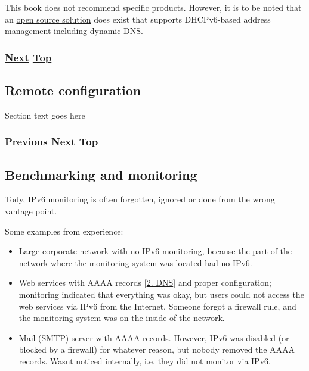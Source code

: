 \documentclass[
]{article}
\begin{document}
This book does not recommend specific products. However, it is to be
noted that an \href{https://www.isc.org/kea/}{open source solution} does
exist that supports DHCPv6-based address management including dynamic
DNS.

\subsubsection{\texorpdfstring{\hyperref[remote-configuration]{Next}
\hyperref[management-and-operations]{Top}}{Next Top}}\label{next-top-5}

\pagebreak

\subsection{Remote configuration}\label{remote-configuration}

Section text goes here

\subsubsection{\texorpdfstring{\hyperref[address-and-prefix-management]{Previous}
\hyperref[benchmarking-and-monitoring]{Next}
\hyperref[management-and-operations]{Top}}{Previous Next Top}}\label{previous-next-top-26}

\pagebreak

\subsection{Benchmarking and
monitoring}\label{benchmarking-and-monitoring}

Tody, IPv6 monitoring is often forgotten, ignored or done from the wrong
vantage point.

Some examples from experience:

\begin{itemize}
\item
  Large corporate network with no IPv6 monitoring, because the part of
  the network where the monitoring system was located had no IPv6.
\item
  Web services with AAAA records {[}\hyperref[dns]{2. DNS}{]} and proper
  configuration; monitoring indicated that everything was okay, but
  users could not access the web services via IPv6 from the Internet.
  Someone forgot a firewall rule, and the monitoring system was on the
  inside of the network.
\item
  Mail (SMTP) server with AAAA records. However, IPv6 was disabled (or
  blocked by a firewall) for whatever reason, but nobody removed the
  AAAA records. Wasn\textquotesingle t noticed internally, i.e. they did
  not monitor via IPv6.
\end{itemize}
\end{document}
